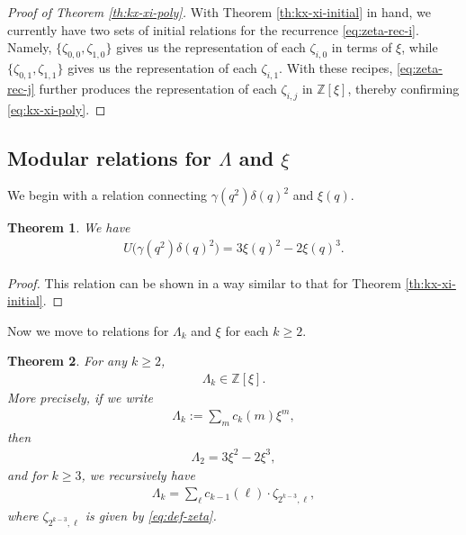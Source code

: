 \documentclass[12pt,reqno]{amsart}
\numberwithin{equation}{section}
\theoremstyle{theorem}
\newtheorem{theorem}{Theorem}
\theoremstyle{definition}
\begin{document}
\begin{proof}[Proof of Theorem \ref{th:kx-xi-poly}]
	With Theorem \ref{th:kx-xi-initial} in hand, we currently have two sets of initial relations for the recurrence \eqref{eq:zeta-rec-i}. Namely, $\{\zeta_{0,0},\zeta_{1,0}\}$ gives us the representation of each $\zeta_{i,0}$ in terms of $\xi$, while $\{\zeta_{0,1},\zeta_{1,1}\}$ gives us the representation of each $\zeta_{i,1}$. With these recipes, \eqref{eq:zeta-rec-j} further produces the representation of each $\zeta_{i,j}$ in $\mathbb{Z}[\xi]$, thereby confirming \eqref{eq:kx-xi-poly}.
\end{proof}


\subsection{Modular relations for $\Lambda$ and $\xi$}

We begin with a relation connecting $\gamma(q^2)\delta(q)^2$ and $\xi(q)$.

\begin{theorem}\label{th:delta-xi}
	We have
	\begin{align}\label{eq:delta-xi}
		U\big(\gamma(q^2)\delta(q)^2\big) = 3 \xi(q)^2 - 2\xi(q)^3 .
	\end{align}
\end{theorem}

\begin{proof}
	This relation can be shown in a way similar to that for Theorem \ref{th:kx-xi-initial}.
\end{proof}

Now we move to relations for $\Lambda_k$ and $\xi$ for each $k\ge 2$.

\begin{theorem}\label{th:L-xi}
	For any $k\ge 2$,
	\begin{align}\label{eq:Lk-xi-poly}
		\Lambda_k \in \mathbb{Z}[\xi].
	\end{align}
	More precisely, if we write
	\begin{align}\label{eq:Lk-xi}
		\Lambda_k:=\sum_{m} c_k(m)\xi^m,
	\end{align}
	then
	\begin{align}\label{eq:L0-xi}
		\Lambda_2 = 3\xi^2-2\xi^3,
	\end{align}
	and for $k\ge 3$, we recursively have
	\begin{align}\label{eq:L-xi-rec}
		\Lambda_k = \sum_{\ell} c_{k-1}(\ell) \cdot \zeta_{2^{k-3},\ell},
	\end{align}
	where $\zeta_{2^{k-3},\ell}$ is given by \eqref{eq:def-zeta}.
\end{theorem}
\end{document}
